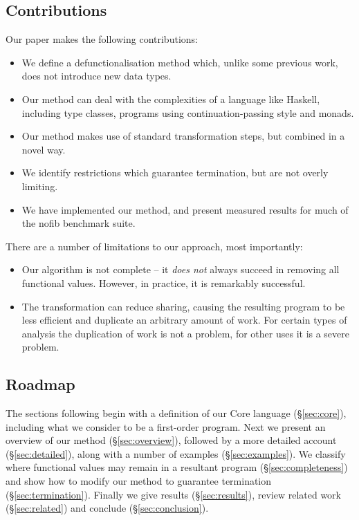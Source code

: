 \documentclass[preprint]{sigplanconf}
\begin{document}
\subsection{Contributions}

Our paper makes the following contributions:

\begin{itemize}
\item We define a defunctionalisation method which, unlike some previous work, does not introduce new data types.
\item Our method can deal with the complexities of a language like Haskell, including type classes, programs using continuation-passing style and monads.
\item Our method makes use of standard transformation steps, but combined in a novel way.
\item We identify restrictions which guarantee termination, but are not overly limiting.
\item We have implemented our method, and present measured results for much of the nofib benchmark suite.
\end{itemize}

\noindent There are a number of limitations to our approach, most importantly:

\begin{itemize}
\item Our algorithm is not complete -- it \textit{does not} always succeed in removing all functional values. However, in practice, it is remarkably successful.
\item The transformation can reduce sharing, causing the resulting program to be less efficient and duplicate an arbitrary amount of work. For certain types of analysis the duplication of work is not a problem, for other uses it is a severe problem.
\end{itemize}

\subsection{Roadmap}


The sections following begin with a definition of our Core language (\S\ref{sec:core}), including what we consider to be a first-order program. Next we present an overview of our method (\S\ref{sec:overview}), followed by a more detailed account (\S\ref{sec:detailed}), along with a number of examples (\S\ref{sec:examples}). We classify where functional values may remain in a resultant program (\S\ref{sec:completeness}) and show how to modify our method to guarantee termination (\S\ref{sec:termination}). Finally we give results (\S\ref{sec:results}), review related work (\S\ref{sec:related}) and conclude (\S\ref{sec:conclusion}).
\end{document}
